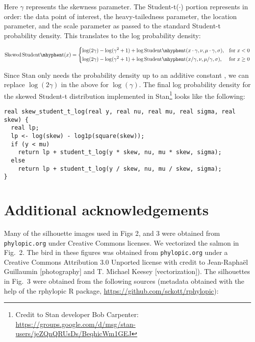 \documentclass[12pt]{article}
\begin{document}
Here $\gamma$ represents the skewness parameter. The Student-t($\cdot$) portion represents in order: the data point of interest, the heavy-tailedness parameter, the location parameter, and the scale parameter as passed to the standard Student-t probability density. This translates to the log probability density:

\begin{equation}
\mathrm{Skewed\,Student\mhyphen t}(x) =
\begin{dcases}
  \log (2 \gamma) - \log(\gamma^2 + 1) +
  \log \mathrm{Student\mhyphen t}(x \cdot \gamma, \nu, \mu \cdot \gamma, \sigma),& \text{for } x < 0\\
  \log (2 \gamma) - \log(\gamma^2 + 1) +
  \log \mathrm{Student\mhyphen t}(x / \gamma, \nu, \mu / \gamma, \sigma),& \text{for } x \ge 0
\end{dcases}
\end{equation}

Since Stan only needs the probability density up to an additive
constant \cite{stan-manual2014}, we
can replace $\log(2 \gamma)$ in the above for $\log(\gamma)$. The final log
probability density for the skewed Student-t distribution implemented in
Stan\footnote{Credit to Stan developer Bob Carpenter:
\url{https://groups.google.com/d/msg/stan-users/jeZQnQRUsDs/BeqhicWm1GEJ}}
looks like the following:

\begin{verbatim}
real skew_student_t_log(real y, real nu, real mu, real sigma, real skew) {
  real lp;
  lp <- log(skew) - log1p(square(skew));
  if (y < mu)
    return lp + student_t_log(y * skew, nu, mu * skew, sigma);
  else
    return lp + student_t_log(y / skew, nu, mu / skew, sigma);
}
\end{verbatim}

\section{Additional acknowledgements}

Many of the silhouette images used in Figs 2, and 3 were obtained from
\texttt{phylopic.org} under Creative Commons licenses. We vectorized the
salmon in Fig.~2. The bird in these figures was obtained
from \texttt{phylopic.org} under a Creative Commons Attribution 3.0 Unported
license with credit to Jean-Raphaël Guillaumin {[}photography{]} and T.
Michael Keesey {[}vectorization{]}). The silhouettes in
Fig.~3 were obtained from the following sources (metadata
obtained with the help of the rphylopic R package,
\url{https://github.com/sckott/rphylopic}):
\end{document}
